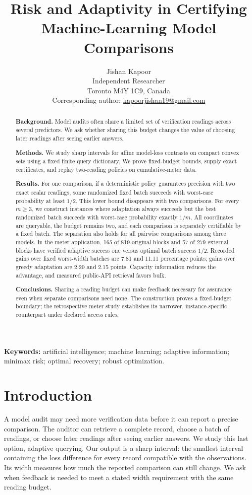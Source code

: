 \documentclass[12pt]{article}
\title{Risk and Adaptivity in Certifying Machine-Learning Model Comparisons}
\author{Jishan Kapoor\\Independent Researcher\\Toronto M4Y 1C9, Canada\\
Corresponding author: \href{mailto:kapoorjishan19@gmail.com}{kapoorjishan19@gmail.com}}
\date{}
\begin{document}
\maketitle
\begin{abstract}
\textbf{Background.} Model audits often share a limited set of verification
readings across several predictors. We ask whether sharing this budget
changes the value of choosing later readings after seeing earlier answers.

\textbf{Methods.} We study sharp intervals for affine model-loss contrasts
on compact convex sets using a fixed finite query dictionary. We prove fixed-budget bounds, supply exact
certificates, and replay two-reading policies on cumulative-meter data.

\textbf{Results.} For one comparison, if a deterministic policy guarantees
precision with two exact scalar readings, some randomized fixed batch succeeds with
worst-case probability at least $1/2$. This lower bound disappears with two
comparisons. For every $m\geq3$, we construct instances where adaptation
always succeeds but the best randomized batch succeeds with worst-case
probability exactly $1/m$. All coordinates are queryable, the budget remains
two, and each comparison is separately certifiable by a fixed batch.
The separation also holds for all pairwise comparisons among three models.
In the meter application, 165 of 819 original blocks and 57 of 279 external
blocks have verified adaptive success one versus optimal batch success $1/2$.
Recorded gains over fixed worst-width batches are 7.81 and 11.11 percentage
points; gains over greedy adaptation are 2.20 and 2.15 points.
Capacity information reduces the advantage, and measured public-API retrieval
favors bulk.

\textbf{Conclusions.} Sharing a reading budget can make feedback necessary
for assurance even when separate comparisons need none. The construction
proves a fixed-budget boundary; the retrospective meter study establishes
its narrower, instance-specific counterpart under declared access rules.
\end{abstract}
\noindent\textbf{Keywords:} artificial intelligence; machine learning;
adaptive information; minimax risk; optimal recovery; robust optimization.

\section{Introduction}
A model audit may need more verification data before it can report a precise
comparison. The auditor can retrieve a complete record, choose a batch of
readings, or choose later readings after seeing earlier answers. We study
this last option, adaptive querying. Our output is a sharp interval: the
smallest interval containing the loss difference for every record compatible
with the observations. Its width measures how much the reported comparison
can still change. We ask when feedback is needed to meet a stated width
requirement with the same reading budget.
\end{document}
